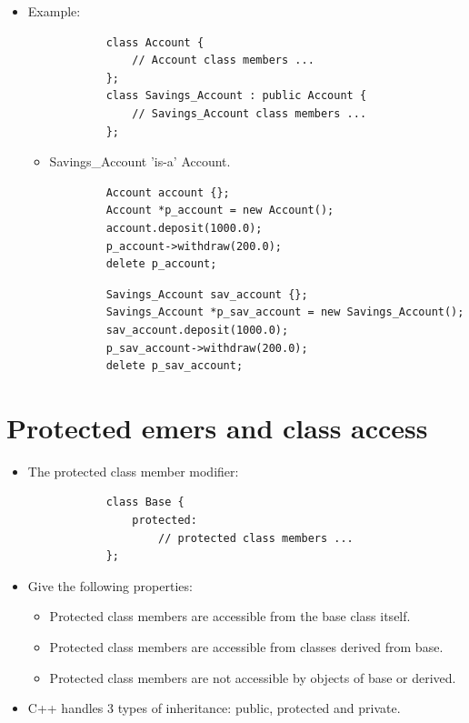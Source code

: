 \begin{itemize}
    \item Example:
        \begin{verbatim}
            class Account {
                // Account class members ...
            }; 
            class Savings_Account : public Account {
                // Savings_Account class members ...
            };
        \end{verbatim}
        \begin{itemize}
            \item Savings\_Account 'is-a' Account.
        \end{itemize}
        \begin{verbatim}
            Account account {};
            Account *p_account = new Account();
            account.deposit(1000.0);
            p_account->withdraw(200.0);
            delete p_account;
        \end{verbatim}
        \begin{verbatim}
            Savings_Account sav_account {};
            Savings_Account *p_sav_account = new Savings_Account();
            sav_account.deposit(1000.0);
            p_sav_account->withdraw(200.0);
            delete p_sav_account;
        \end{verbatim}
\end{itemize}

\section{Protected emers and class access}
\begin{itemize}
    \item The protected class member modifier:
        \begin{verbatim}
            class Base {
                protected: 
                    // protected class members ...
            };
        \end{verbatim}
    
    \item Give the following properties:
        \begin{itemize}
            \item Protected class members are accessible from the base class itself.
            \item Protected class members are accessible from classes derived from base.
            \item Protected class members are not accessible by objects of base or derived.
        \end{itemize}
    
    \item C++ handles 3 types of inheritance: public, protected and private.
\end{itemize}

